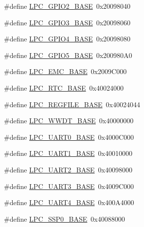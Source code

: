 \begin{DoxyCompactItemize}
\item 
\#define \hyperlink{group__PERIPH__177X__8X__BASE_gae5524b2d728167194033ec7a1841a36b}{L\-P\-C\-\_\-\-G\-P\-I\-O2\-\_\-\-B\-A\-S\-E}~0x20098040
\item 
\#define \hyperlink{group__PERIPH__177X__8X__BASE_ga56c68c5326b521b3278a35f4d81369a9}{L\-P\-C\-\_\-\-G\-P\-I\-O3\-\_\-\-B\-A\-S\-E}~0x20098060
\item 
\#define \hyperlink{group__PERIPH__177X__8X__BASE_gaa54352e7745932e78b56bcbc1d70fa21}{L\-P\-C\-\_\-\-G\-P\-I\-O4\-\_\-\-B\-A\-S\-E}~0x20098080
\item 
\#define \hyperlink{group__PERIPH__177X__8X__BASE_gaf6bbc732156be98ff8a4d15fa7558ad6}{L\-P\-C\-\_\-\-G\-P\-I\-O5\-\_\-\-B\-A\-S\-E}~0x200980\-A0
\item 
\#define \hyperlink{group__PERIPH__177X__8X__BASE_ga52f586bf3c6855ad4ef03b1fee3f2f0d}{L\-P\-C\-\_\-\-E\-M\-C\-\_\-\-B\-A\-S\-E}~0x2009\-C000
\item 
\#define \hyperlink{group__PERIPH__177X__8X__BASE_ga4618213cf968f8245814d7d3e7aa2e2e}{L\-P\-C\-\_\-\-R\-T\-C\-\_\-\-B\-A\-S\-E}~0x40024000
\item 
\#define \hyperlink{group__PERIPH__177X__8X__BASE_gad2674eff10cea9243ab060ad1fbac9d2}{L\-P\-C\-\_\-\-R\-E\-G\-F\-I\-L\-E\-\_\-\-B\-A\-S\-E}~0x40024044
\item 
\#define \hyperlink{group__PERIPH__177X__8X__BASE_ga9b83c39ba53f9c9e87974984c96e35de}{L\-P\-C\-\_\-\-W\-W\-D\-T\-\_\-\-B\-A\-S\-E}~0x40000000
\item 
\#define \hyperlink{group__PERIPH__177X__8X__BASE_gaa96fb70405a1298b350fc6f0ad0af997}{L\-P\-C\-\_\-\-U\-A\-R\-T0\-\_\-\-B\-A\-S\-E}~0x4000\-C000
\item 
\#define \hyperlink{group__PERIPH__177X__8X__BASE_ga18e8f96b25e3f343bdd7ba552ae7a617}{L\-P\-C\-\_\-\-U\-A\-R\-T1\-\_\-\-B\-A\-S\-E}~0x40010000
\item 
\#define \hyperlink{group__PERIPH__177X__8X__BASE_ga8c3873ab74db743465b038c74b365281}{L\-P\-C\-\_\-\-U\-A\-R\-T2\-\_\-\-B\-A\-S\-E}~0x40098000
\item 
\#define \hyperlink{group__PERIPH__177X__8X__BASE_gac8dc517d5e03d4ca7666c18c89d5052e}{L\-P\-C\-\_\-\-U\-A\-R\-T3\-\_\-\-B\-A\-S\-E}~0x4009\-C000
\item 
\#define \hyperlink{group__PERIPH__177X__8X__BASE_ga52bf68ce53e20c93366ba5496e98f5c8}{L\-P\-C\-\_\-\-U\-A\-R\-T4\-\_\-\-B\-A\-S\-E}~0x400\-A4000
\item 
\#define \hyperlink{group__PERIPH__177X__8X__BASE_ga53fb1af80b541545988f2a966681abfd}{L\-P\-C\-\_\-\-S\-S\-P0\-\_\-\-B\-A\-S\-E}~0x40088000

\end{DoxyCompactItemize}
